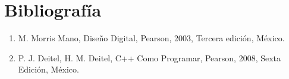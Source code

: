 \documentclass{article}
\begin{document}
\section{Bibliografía}
\begin{enumerate}
\item M. Morris Mano, Diseño Digital, Pearson, 2003, Tercera edición, México.
\item P. J. Deitel, H. M. Deitel, C++ Como Programar, Pearson, 2008, Sexta Edición, México.

\end{enumerate}
\bigskip
{}
\end{document}
